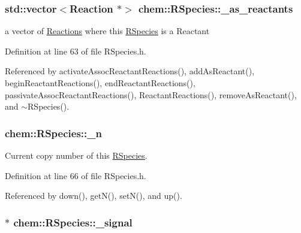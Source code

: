 \hypertarget{classchem_1_1RSpecies_a3749fed57bf55e5677b4519b403598ba}{
\subsubsection[{\-\_\-as\-\_\-reactants}]{\setlength{\rightskip}{0pt plus 5cm}std\-::vector$<${\bf Reaction} $\ast$$>$ {\bf chem\-::\-R\-Species\-::\-\_\-as\-\_\-reactants}}}\label{classchem_1_1RSpecies_a3749fed57bf55e5677b4519b403598ba}


a vector of \hyperlink{classchem_1_1Reaction}{Reactions} where this \hyperlink{classchem_1_1RSpecies}{R\-Species} is a Reactant 



Definition at line 63 of file R\-Species.\-h.



Referenced by activate\-Assoc\-Reactant\-Reactions(), add\-As\-Reactant(), begin\-Reactant\-Reactions(), end\-Reactant\-Reactions(), passivate\-Assoc\-Reactant\-Reactions(), Reactant\-Reactions(), remove\-As\-Reactant(), and $\sim$\-R\-Species().

\hypertarget{classchem_1_1RSpecies_a60e53ebfe464923452c54322dfd479dc}{
\subsubsection[{\-\_\-n}]{ {\bf chem\-::\-R\-Species\-::\-\_\-n}}}\label{classchem_1_1RSpecies_a60e53ebfe464923452c54322dfd479dc}


Current copy number of this \hyperlink{classchem_1_1RSpecies}{R\-Species}. 



Definition at line 66 of file R\-Species.\-h.



Referenced by down(), get\-N(), set\-N(), and up().

\hypertarget{classchem_1_1RSpecies_acd60296c77857284cd935cb6faaf4200}{
\subsubsection[{\-\_\-signal}]{$\ast$ {\bf chem\-::\-R\-Species\-::\-\_\-signal}}}\label{classchem_1_1RSpecies_acd60296c77857284cd935cb6faaf4200}


